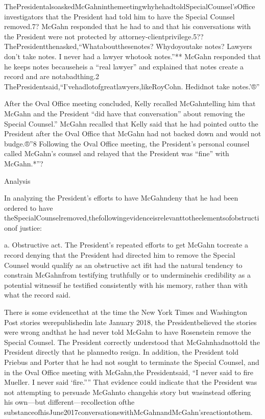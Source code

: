 ThePresidentalsoaskedMcGahninthemeetingwhyhehadtoldSpecialCounsel’sOffice investigators that the President had told him to have the Special Counsel removed.7? McGahn responded that he had to and that his conversations with the President were not protected by attorney-clientprivilege.5?? ThePresidentthenasked,“Whataboutthesenotes? Whydoyoutake notes? Lawyers don’t take notes. I never had a lawyer whotook notes.”** McGahn responded that he keeps notes becauseheis a “real lawyer” and explained that notes create a record and are notabadthing.2 ThePresidentsaid,“I’vehadlotofgreatlawyers,likeRoyCohn. Hedidnot take notes.’®”

After the Oval Office meeting concluded, Kelly recalled McGahntelling him that McGahn and the President “did have that conversation” about removing the Special Counsel.” McGahn recalled that Kelly said that he had pointed outto the President after the Oval Office that McGahn had not backed down and would not budge.®”8 Following the Oval Office meeting, the President’s personal counsel called McGahn’s counsel and relayed that the President was “fine” with McGahn.*”?

Analysis

In analyzing the President’s efforts to have McGahndeny that he had been ordered to have theSpecialCounselremoved,thefollowingevidenceisrelevanttotheelementsofobstructionof
justice:

a. Obstructive act. The President’s repeated efforts to get McGahn tocreate a record denying that the President had directed him to remove the Special Counsel would qualify as an obstructive act ifit had the natural tendency to constrain McGahnfrom testifying truthfully or to underminehis credibility as a potential witnessif he testified consistently with his memory, rather than with what the record said.

There is some evidencethat at the time the New York Times and Washington Post stories werepublishedin late January 2018, the Presidentbelieved the stories were wrong andthat he had never told McGahn to have Rosenstein remove the Special Counsel. The President correctly understood that McGahnhadnottold the President directly that he plannedto resign. In addition, the President told Priebus and Porter that he had not sought to terminate the Special Counsel, and
in the Oval Office meeting with McGahn,the Presidentsaid, “I never said to fire Mueller. I never said ‘fire.”” That evidence could indicate that the President was not attempting to persuade McGahnto changehis story but wasinstead offering his own—but different—recollection ofthe substanceofhisJune2017conversationswithMcGahnandMcGahn’sreactiontothem.

